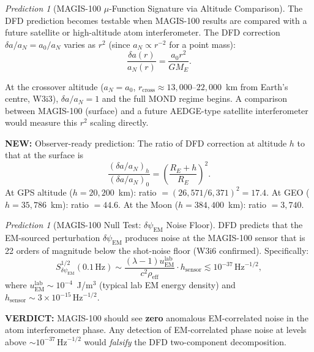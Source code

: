 \documentclass[11pt]{article}
\theoremstyle{definition}
\theoremstyle{remark}
\newtheorem{prediction}[theorem]{Prediction}
\newcommand{\ee}[1]{\times10^{#1}}
\newcommand{\sqrtHz}{\,\mathrm{Hz}^{-1/2}}
\newcommand{\dpsiem}{\delta\psi_{\mathrm{EM}}}
\newcommand{\azero}{a_0}
\newcommand{\newresult}[1]{\textcolor{green!50!black}{\textbf{NEW:} #1}}
\newcommand{\verdict}[1]{\textcolor{green!50!black}{\textbf{VERDICT:} #1}}
\begin{document}
\begin{prediction}[MAGIS-100 $\mu$-Function Signature via Altitude Comparison]
\label{pred:altitude}
The DFD prediction becomes testable when MAGIS-100 results are compared
with a future satellite or high-altitude atom interferometer. The
DFD correction $\delta a/a_N = \azero/a_N$ varies as $r^2$ (since
$a_N \propto r^{-2}$ for a point mass):
\begin{equation}
\frac{\delta a(r)}{a_N(r)} = \frac{\azero r^2}{GM_E}.
\label{eq:altitude-scaling}
\end{equation}

At the crossover altitude ($a_N = \azero$, $r_{\mathrm{cross}} \approx
13{,}000$--$22{,}000$~km from Earth's centre, W3i3), $\delta a/a_N = 1$
and the full MOND regime begins. A comparison between MAGIS-100 (surface)
and a future AEDGE-type satellite interferometer would measure this
$r^2$ scaling directly.

\newresult{Observer-ready prediction: The ratio of DFD correction
at altitude $h$ to that at the surface is}
\begin{equation}
\frac{(\delta a/a_N)_h}{(\delta a/a_N)_0}
= \left(\frac{R_E + h}{R_E}\right)^2.
\end{equation}
At GPS altitude ($h = 20{,}200$~km): ratio $= (26{,}571/6{,}371)^2 = 17.4$.
At GEO ($h = 35{,}786$~km): ratio $= 44.6$.
At the Moon ($h = 384{,}400$~km): ratio $= 3{,}740$.
\end{prediction}

\begin{prediction}[MAGIS-100 Null Test: $\dpsiem$ Noise Floor]
\label{pred:null}
DFD predicts that the EM-sourced perturbation $\dpsiem$ produces noise
at the MAGIS-100 sensor that is 22 orders of magnitude below the
shot-noise floor (W3i6 confirmed). Specifically:
\begin{equation}
S_{\dpsiem}^{1/2}(0.1\,\mathrm{Hz})
\sim \frac{(\lambda-1) u_{\mathrm{EM}}^{\mathrm{lab}}}{c^2 \rho_{\mathrm{eff}}}
\cdot h_{\mathrm{sensor}}
\lesssim 10^{-37}\sqrtHz,
\end{equation}
where $u_{\mathrm{EM}}^{\mathrm{lab}} \sim 10^{-4}$~J/m$^3$ (typical lab EM
energy density) and $h_{\mathrm{sensor}} \sim 3\ee{-15}\sqrtHz$.

\verdict{MAGIS-100 should see \textbf{zero} anomalous EM-correlated noise in
the atom interferometer phase. Any detection of EM-correlated phase noise at
levels above $\sim 10^{-37}\sqrtHz$ would \emph{falsify} the DFD two-component
decomposition.}
\end{prediction}
\end{document}
